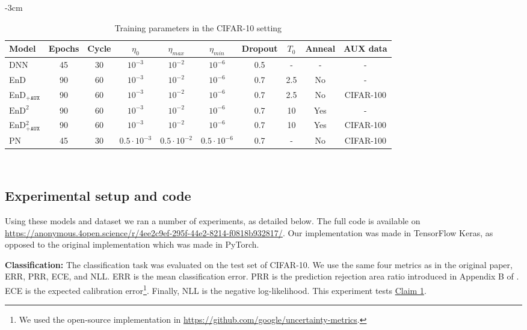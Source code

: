 \begin{table}
\centering
\caption{Training parameters in the CIFAR-10 setting}
\addtolength{\leftskip} {-3cm}
\addtolength{\rightskip}{-3cm}
\begin{tabular}{l||c|c|c|c|c|c|c|c|c}
\hline
Model & Epochs & Cycle &  $\eta_0$ & $\eta_{max}$ & $\eta_{min}$ & Dropout & $T_0$ & Anneal & AUX data \\ [0.5ex] 
\hline
\hline
DNN & 45 & 30 & $10^{-3}$ & $10^{-2}$ & $10^{-6}$ & 0.5 & - & - & - \\
EnD & 90 & 60 & $10^{-3}$ & $10^{-2}$ & $10^{-6}$ & 0.7 & 2.5 & No & - \\
EnD$_{\texttt{+AUX}}$ & 90 & 60 & $10^{-3}$ & $10^{-2}$ & $10^{-6}$ & 0.7 & 2.5 & No & CIFAR-100 \\
$\text{EnD}^2$ & 90 & 60 & $10^{-3}$ & $10^{-2}$ & $10^{-6}$ & 0.7 & 10 & Yes & - \\
EnD$^2_{\texttt{+AUX}}$ & 90 & 60 & $10^{-3}$ & $10^{-2}$ & $10^{-6}$ & 0.7 & 10 & Yes & CIFAR-100 \\
PN & 45 & 30 & $0.5 \cdot 10^{-3}$ & $0.5 \cdot 10^{-2}$ & $0.5 \cdot 10^{-6}$ & 0.7 & - & No & CIFAR-100 \\
\hline
\end{tabular}
\\ [1ex] 

\label{tab:cifar10-training}
\end{table}

\subsection{Experimental setup and code}
Using these models and dataset we ran a number of experiments, as detailed below. The full code is available on \href{z}{https://anonymous.4open.science/r/4ee2c9ef-295f-44e2-8214-f0818b932817/}. Our implementation was made in TensorFlow Keras, as opposed to the original implementation which was made in PyTorch.

\textbf{Classification:} The classification task was evaluated on the test set of CIFAR-10. We use the same four metrics as in the original paper, ERR, PRR, ECE, and NLL. ERR is the mean classification error. PRR is the prediction rejection area ratio introduced in Appendix B of \cite{malinin2019ensemble}. ECE is the expected calibration error\footnote{We used the open-source implementation in \url{https://github.com/google/uncertainty-metrics}.}. Finally, NLL is the negative log-likelihood. This experiment tests \hyperlink{claim1}{Claim 1}. 


